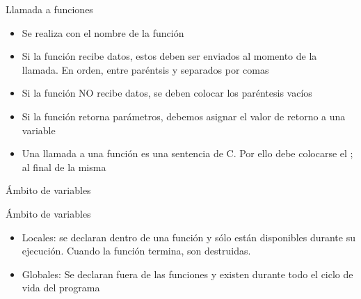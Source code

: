 \documentclass[xcolor=pdftex,table,11pt]{beamer}
\begin{document}
\begin{frame}[allowframebreaks]{Llamada a funciones}
\begin{itemize}
\item  Se realiza con el nombre de la función
\item  Si la función recibe datos, estos deben ser enviados al momento de la llamada. En orden, entre paréntsis y separados por comas
\item  Si la función NO recibe datos, se deben colocar los paréntesis vacíos
\item  Si la función retorna parámetros, debemos asignar el valor de retorno a una variable
\item  Una llamada a una función es una sentencia de C. Por ello debe colocarse el ; al final de la misma

\end{itemize}



\href{https://github.com/danis963/informaticaI_IUA/blob/main/c/src/7-funcion_sumar.c}{}


\end{frame}

\begin{frame}{Ámbito de variables}
\begin{block}{Ámbito de variables}
\begin{itemize}
\item  Locales: se declaran dentro de una función y sólo están disponibles durante su ejecución. Cuando la función termina, son destruidas.
\item Globales: Se declaran fuera de las funciones y existen durante todo el ciclo de vida del programa
\end{itemize}

\href{https://github.com/danis963/informaticaI_IUA/blob/main/c/src/7-variables.c}{}
\end{block}

\end{frame}
\end{document}
